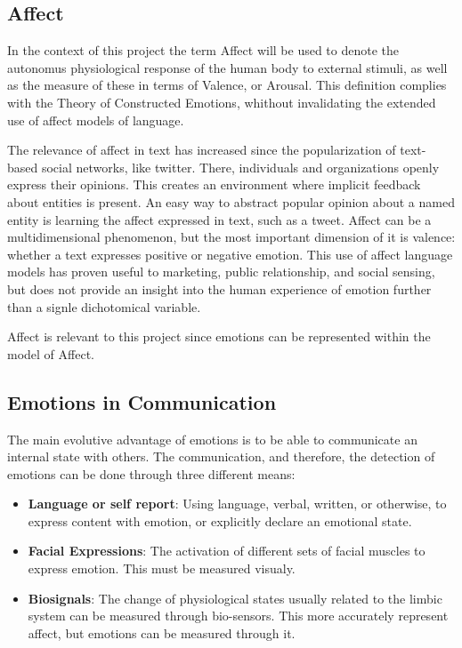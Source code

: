 
\subsection{Affect}\label{sub:Affect}
In the context of this project the term Affect will be used to denote the autonomus physiological response of the human body to external stimuli, as well as the measure of these in terms of Valence, or Arousal. This definition complies with the Theory of Constructed Emotions, whithout invalidating the extended use of affect models of language.

The relevance of affect in text has increased since the popularization of text-based social networks, like twitter. There, individuals and organizations openly express their opinions. This creates an environment where implicit feedback about entities is present. An easy way to abstract popular opinion about a named entity is learning the affect expressed in text, such as a tweet. Affect can be a multidimensional phenomenon, but the most important dimension of it is valence: whether a text expresses positive or negative emotion. This use of affect language models has proven useful to marketing, public relationship, and social sensing, but does not provide an insight into the human experience of emotion further than a signle dichotomical variable.

Affect is relevant to this project since emotions can be represented within the model of Affect.

\subsection{Emotions in Communication}\label{sub:Emotions in Communication}
The main evolutive advantage of emotions is to be able to communicate an internal state with others. The communication, and therefore, the detection of emotions can be done through three different means:
\begin{itemize}
  \item \textbf{Language or self report}: Using language, verbal, written, or otherwise, to express content with emotion, or explicitly declare an emotional state.
  \item \textbf{Facial Expressions}: The activation of different sets of facial muscles to express emotion. This must be measured visualy.
  \item \textbf{Biosignals}: The change of physiological states usually related to the limbic system can be measured through bio-sensors. This more accurately represent affect, but emotions can be measured through it.
\end{itemize}

